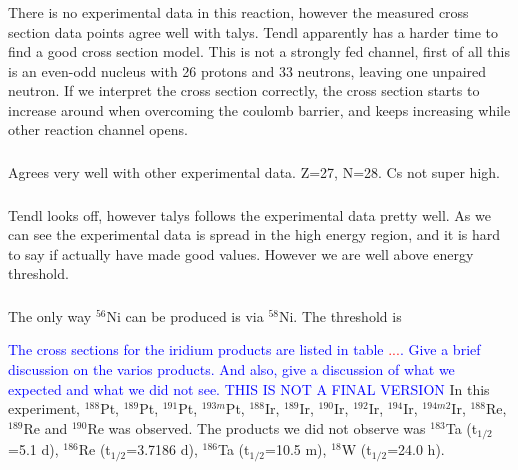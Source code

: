 \subsubsection{}
There is no experimental data in this reaction, however the measured cross section data points agree well with talys. Tendl apparently has a harder time to find a good cross section model. This is not a strongly fed channel, first of all this is an even-odd nucleus with 26 protons and 33 neutrons, leaving one unpaired neutron. If we interpret the cross section correctly, the cross section starts to increase around when overcoming the coulomb barrier, and keeps increasing while other reaction channel opens. 

\subsubsection{}

Agrees very well with other experimental data. Z=27, N=28. Cs not super high. 

\subsubsection{}
Tendl looks off, however talys follows the experimental data pretty well. As we can see the experimental data is spread in the high energy region, and it is hard to say if actually have made good values. However we are well above energy threshold. 

\subsubsection{}
The only way $^{56}$Ni can be produced is via $^{58}$Ni. The threshold is 



\newpage


\noindent \textcolor{blue}{The cross sections for the iridium products are listed in table \textcolor{red}{...}. Give a brief discussion on the varios products. And also, give a discussion of what we expected and what we did not see. THIS IS NOT A FINAL VERSION } In this experiment, $^{188}$Pt, $^{189}$Pt, $^{191}$Pt, $^{193m}$Pt, $^{188}$Ir, $^{189}$Ir, $^{190}$Ir, $^{192}$Ir, $^{194}$Ir, $^{194m2}$Ir, $^{188}$Re, $^{189}$Re and $^{190}$Re was observed. The products we did not observe was $^{183}$Ta (t$_{1/2}$=5.1 d), $^{186}$Re (t$_{1/2}$=3.7186 d), $^{186}$Ta (t$_{1/2}$=10.5 m), $^{18}$W (t$_{1/2}$=24.0 h). \\

